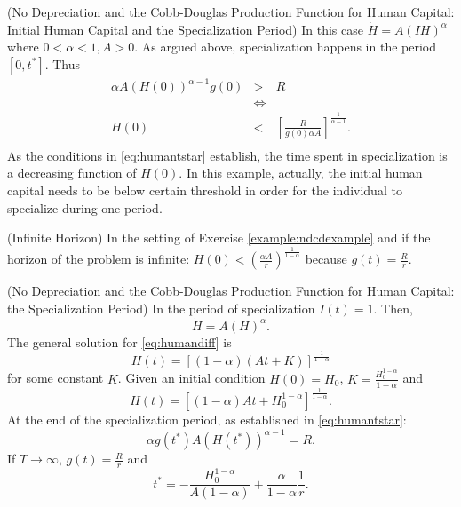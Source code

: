 \begin{example} (No Depreciation and the Cobb-Douglas Production Function for Human Capital: Initial Human Capital and the Specialization Period) \label{example:ndcdexample}
In this case $\dot{H} = A \left(IH \right)^\alpha$ where $0 < \alpha < 1, A>0$. As argued above, specialization happens in the period $[0,t^*]$. Thus
\begin{eqnarray}
	\alpha A \left( H(0) \right) ^{\alpha - 1 }g(0) &>& R \nonumber \\
	&\Leftrightarrow& \nonumber \\
	H(0) &<& \left[ \frac{R}{g(0)\alpha A} \right]^{\frac{1}{\alpha-1}}.\\	
\end{eqnarray}
\indent As the conditions in \eqref{eq:humantstar} establish, the time spent in specialization is a decreasing function of $H(0)$. In this example, actually, the initial human capital needs to be below certain threshold in order for the individual to specialize during one period. 
\end{example}

\begin{example} (Infinite Horizon)
In the setting of Exercise \ref{example:ndcdexample} and if the horizon of the problem is infinite: $H(0) < \left( \frac{\alpha A}{r} \right) ^{\frac{1}{1 - \alpha}}$ because $g(t) = \frac{R}{r}$.
\end{example}

\begin{example} (No Depreciation and the Cobb-Douglas Production Function for Human Capital: the Specialization Period)
In the period of specialization $I(t) = 1$. Then,
\begin{equation}
\dot{H} = A \left( H \right)^{\alpha} \label{eq:humandiff}.
\end{equation}
The general solution for \eqref{eq:humandiff} is
\begin{equation}
H(t) = \left[ (1 - \alpha)(At + K) \right]^{\frac{1}{1-\alpha}}
\end{equation}
for some constant $K$. Given an initial condition $H(0) = H_{0}$, $K = \frac{H_{0}^{1-\alpha}}{1-\alpha}$ and
\begin{equation}
H(t) = \left[ (1 - \alpha)At + H_{0}^{1-\alpha} \right]^{\frac{1}{1-\alpha}}.
\end{equation}
At the end of the specialization period, as established in \eqref{eq:humantstar}:
\begin{equation}
\alpha g(t^*) A \left( H(t^*) \right)^{\alpha - 1} = R.
\end{equation}
If $T \rightarrow \infty$, $g(t) = \frac{R}{r}$ and
\begin{equation}
t^* = - \frac{H_{0}^{1 - \alpha}}{A(1 - \alpha)} + \frac{\alpha}{1 - \alpha}\frac{1}{r}.
\end{equation}
\end{example}










